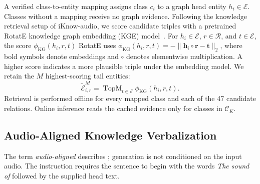 A verified class-to-entity mapping assigns class $c_i$ to a graph head entity $h_i\in\mathcal E$. Classes without a mapping receive no graph evidence. Following the knowledge retrieval setup of iKnow-audio, we score candidate triples with a pretrained RotatE knowledge graph embedding (KGE) model~\cite{olvera-etal-2025-iknow,sun2019rotate}. For $h_i\in\mathcal E$, $r\in\mathcal R$, and $t\in\mathcal E$, the score $\phi_{\mathrm{KG}}(h_i,r,t)$  RotatE uses $\phi_{\mathrm{KG}}(h_i,r,t)=-\|\mathbf h_i\circ\mathbf r-\mathbf t\|_2$, where bold symbols denote embeddings and $\circ$ denotes elementwise multiplication.  A higher score indicates a more plausible triple under the embedding model. We retain the $M$ highest-scoring tail entities:
\begin{equation}
\widetilde{\mathcal E}_{i,r}^{M}=\operatorname{TopM}_{t\in\mathcal E}\phi_{\mathrm{KG}}(h_i,r,t).
\label{eq:tail-retrieval}
\end{equation}
 Retrieval is performed offline for every mapped class and each of the 47 candidate relations. Online inference reads the cached evidence only for classes in $\mathcal C_K$.

\subsection{Audio-Aligned Knowledge Verbalization}\label{sec:aakv-method}

The term \emph{audio-aligned} describes ; generation is not conditioned on the input audio. The instruction requires the sentence to begin with the words \textit{The sound of} followed by the supplied head text. 

